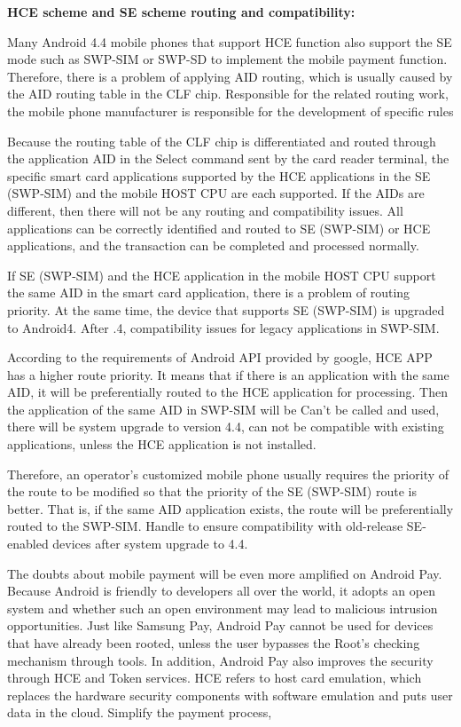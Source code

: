 \documentclass[journal]{IEEEtran}
\begin{document}
\textbf{HCE scheme and SE scheme routing and compatibility:}

Many Android 4.4 mobile phones that support HCE function also support the SE mode such as SWP-SIM or SWP-SD to implement the mobile payment function. Therefore, there is a problem of applying AID routing, which is usually caused by the AID routing table in the CLF chip. Responsible for the related routing work, the mobile phone manufacturer is responsible for the development of specific rules

Because the routing table of the CLF chip is differentiated and routed through the application AID in the Select command sent by the card reader terminal, the specific smart card applications supported by the HCE applications in the SE (SWP-SIM) and the mobile HOST CPU are each supported. If the AIDs are different, then there will not be any routing and compatibility issues. All applications can be correctly identified and routed to SE (SWP-SIM) or HCE applications, and the transaction can be completed and processed normally.

If SE (SWP-SIM) and the HCE application in the mobile HOST CPU support the same AID in the smart card application, there is a problem of routing priority. At the same time, the device that supports SE (SWP-SIM) is upgraded to Android4. After .4, compatibility issues for legacy applications in SWP-SIM.

According to the requirements of Android API provided by google, HCE APP has a higher route priority. It means that if there is an application with the same AID, it will be preferentially routed to the HCE application for processing. Then the application of the same AID in SWP-SIM will be Can't be called and used, there will be system upgrade to version 4.4, can not be compatible with existing applications, unless the HCE application is not installed.

Therefore, an operator's customized mobile phone usually requires the priority of the route to be modified so that the priority of the SE (SWP-SIM) route is better. That is, if the same AID application exists, the route will be preferentially routed to the SWP-SIM. Handle to ensure compatibility with old-release SE-enabled devices after system upgrade to 4.4.


The doubts about mobile payment will be even more amplified on Android Pay. Because Android is friendly to developers all over the world, it adopts an open system and whether such an open environment may lead to malicious intrusion opportunities. Just like Samsung Pay, Android Pay cannot be used for devices that have already been rooted, unless the user bypasses the Root's checking mechanism through tools. In addition, Android Pay also improves the security through HCE and Token services. HCE refers to host card emulation, which replaces the hardware security components with software emulation and puts user data in the cloud. Simplify the payment process,
\end{document}

